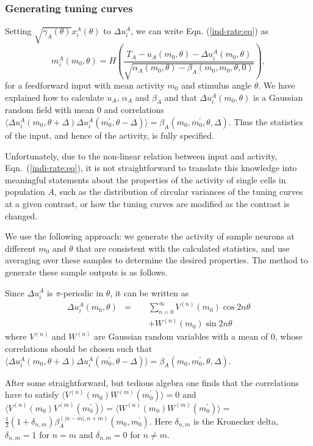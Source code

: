\subsubsection*{Generating tuning curves}
Setting $\sqrt{\gamma_A(\theta)}x_i^A(\theta)$ to $\Delta u_i^A$, we can
write Eqn. (\ref{ind-rate:eq}) as
\begin{equation}
m_i^A(m_0,\theta)=H\left(\frac{T_A-u_A(m_0,\theta)-\Delta u_i^A(m_0,\theta)}
{\sqrt{\alpha_A(m_0,\theta)-\beta_A(m_0,m_0,\theta,0)}}\right),
\label{indi-rate:eq}
\end{equation}
for a feedforward input with mean activity $m_0$ and stimulus angle $\theta$\@.
We have explained how to calculate $u_A$, $\alpha_A$ and $\beta_A$ and that
$\Delta u_i^A(m_0,\theta)$ is a Gaussian random field with
mean 0 and correlations $\langle \Delta u_i^A(m_0,\theta+\Delta)
\Delta u_i^A(m_0^\prime,\theta-\Delta)\rangle=
\beta_{A}(m_0,m_0^\prime,\theta,\Delta)$\@. Thus the statistics of the input, 
and hence of the activity, is fully specified. 

Unfortunately, due to the 
non-linear relation between input and activity, Eqn.~(\ref{indi-rate:eq}),
it is not straightforward to translate this knowledge into meaningful
statements about the properties of the activity of single cells in population 
$A$, such as the distribution of circular variances of the tuning curves at
a given contrast, or how the tuning curves are modified as the contrast is 
changed. 

We use the following approach: we generate the activity of sample neurons 
at different $m_0$ and $\theta$ that are consistent with the calculated 
statistics, and use averaging over these samples to determine the desired 
properties. The method to generate these sample outputs is as follows.

Since $\Delta u_i^{A}$ is $\pi$-periodic in $\theta$, it can be
written as
\begin{eqnarray}
\Delta u_i^{A}(m_0,\theta) &=& \sum_{n=0}^\infty V^{(n)}(m_0)\cos 2n\theta \nonumber \\
&\qquad& + W^{(n)}(m_0)\sin 2n\theta
\end{eqnarray}
where $V^{(n)}$ and $W^{(n)}$ are Gaussian random variables with a mean of 0,
whose correlations should be chosen such that 
$\langle \Delta u_i^{A}(m_0,\theta+\Delta)
\Delta u_i^{A}(m_0^\prime,\theta-\Delta)\rangle=
\beta_A(m_0,m_0^\prime,\theta,\Delta)$\@. 

After some straightforward, but tedious algebra one finds that
the correlations have to satisfy 
$\langle V^{(n)}(m_0)W^{(m)}(m_0^\prime)\rangle=0$ and
$\langle V^{(n)}(m_0)V^{(m)}(m_0^\prime)\rangle=
 \langle W^{(n)}(m_0)W^{(m)}(m_0^\prime)\rangle=$\\$
\frac{1}{2}(1+\delta_{n,m})\beta_{A}^{(|n-m|,n+m)}(m_0,m_0^\prime)$\@.
Here $\delta_{n,m}$ is the Kronecker delta, $\delta_{n,m}=1$ for $n=m$ and
$\delta_{n,m}=0$ for $n\neq m$\@.

